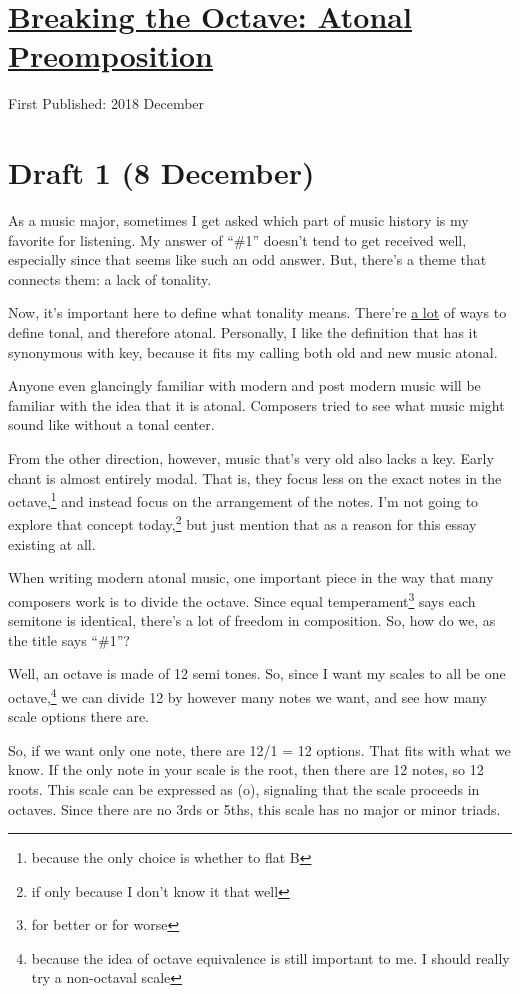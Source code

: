 \documentclass[12pt]{article}[titlepage]
\newcommand{\say}[1]{``\#1''}
\newcommand{\1}{\={a}}
\newcommand{\2}{\={e}}
\newcommand{\3}{\={\i}}
\newcommand{\4}{\=o}
\newcommand{\5}{\=u}
\newcommand{\6}{\={A}}
\renewcommand{\,}{\textsuperscript{,}}
\begin{document}
\doublespacing
\section{\href{atonal-precomposition.html}{Breaking the Octave: Atonal Preomposition}}
First Published: 2018 December
\section{Draft 1 (8 December)}
As a music major, sometimes I get asked which part of music history is my favorite for listening.
My answer of \say{everything that's before Baroque or after Romantic} doesn't tend to get received well, especially since that seems like such an odd answer.
But, there's a theme that connects them: a lack of tonality.

Now, it's important here to define what tonality means.
There're \href{https://en.wikipedia.org/wiki/Tonality}{a lot} of ways to define tonal, and therefore atonal.
Personally, I like the definition that has it synonymous with key, because it fits my calling both old and new music atonal.

Anyone even glancingly familiar with modern and post modern music will be familiar with the idea that it is atonal.
Composers tried to see what music might sound like without a tonal center.

From the other direction, however, music that's very old also lacks a key.
Early chant is almost entirely modal.
That is, they focus less on the exact notes in the octave,\footnote{because the only choice is whether to flat B} and instead focus on the arrangement of the notes.
I'm not going to explore that concept today,\footnote{if only because I don't know it that well} but just mention that as a reason for this essay existing at all.

When writing modern atonal music, one important piece in the way that many composers work is to divide the octave.
Since equal temperament\footnote{for better or for worse} says each semitone is identical, there's a lot of freedom in composition.
So, how do we, as the title says \say{Break the Octave}?

Well, an octave is made of 12 semi tones.
So, since I want my scales to all be one octave,\footnote{because the idea of octave equivalence is still important to me. I should really try a non-octaval scale} we can divide 12 by however many notes we want, and see how many scale options there are.

So, if we want only one note, there are 12/1 = 12 options.
That fits with what we know.
If the only note in your scale is the root, then there are 12 notes, so 12 roots.
This scale can be expressed as (o), signaling that the scale proceeds in octaves.
Since there are no 3rds or 5ths, this scale has no major or minor triads.
\end{document}
